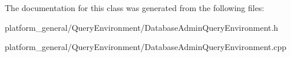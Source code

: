 \-The documentation for this class was generated from the following files\-:\begin{DoxyCompactItemize}
\item 
platform\-\_\-general/\-Query\-Environment/\-Database\-Admin\-Query\-Environment.\-h\item 
platform\-\_\-general/\-Query\-Environment/\-Database\-Admin\-Query\-Environment.\-cpp\end{DoxyCompactItemize}
